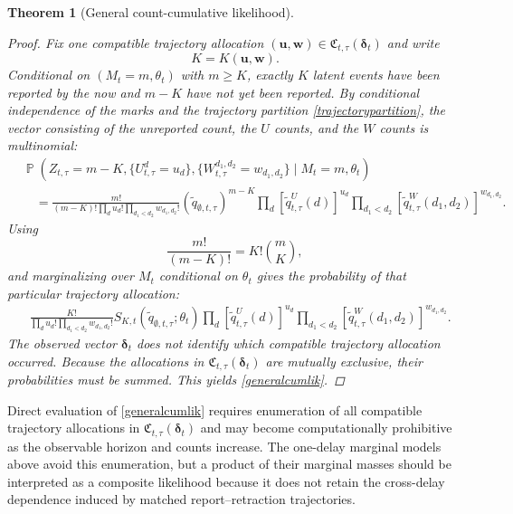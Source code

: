 \documentclass{article}
\newtheorem{theorem}{Theorem}
\theoremstyle{definition}
\theoremstyle{remark}
\newcommand{\Prb}{\operatorname{\mathbb{P}}}
\begin{document}
\begin{theorem}[General count-cumulative likelihood]
\begin{proof}
Fix one compatible trajectory allocation $(\boldsymbol u,\boldsymbol w)\in\mathfrak C_{t,\tau}(\boldsymbol\delta_t)$ and write
\begin{equation}
    K=K(\boldsymbol u,\boldsymbol w).
\end{equation}
Conditional on $(M_t=m,\theta_t)$ with $m\geq K$, exactly $K$ latent events have been reported by the now and $m-K$ have not yet been reported. By conditional independence of the marks and the trajectory partition \eqref{trajectorypartition}, the vector consisting of the unreported count, the $U$ counts, and the $W$ counts is multinomial:
\begin{equation}
\begin{split}
    &\Prb\left(
    Z_{t,\tau}=m-K,
    \{U_{t,\tau}^{d}=u_d\},
    \{W_{t,\tau}^{d_1,d_2}=w_{d_1,d_2}\}
    \mid M_t=m,\theta_t
    \right)\\
    &\quad=
    \frac{m!}
    {(m-K)!
    \displaystyle\prod_d u_d!
    \displaystyle\prod_{d_1<d_2}w_{d_1,d_2}!}
    \left(\tilde q_{\emptyset,t,\tau}\right)^{m-K}
    \prod_d
    \left[\tilde q_{t,\tau}^{U}(d)\right]^{u_d}
    \prod_{d_1<d_2}
    \left[\tilde q_{t,\tau}^{W}(d_1,d_2)\right]^{w_{d_1,d_2}}.
\end{split}
\end{equation}
Using
\begin{equation}
    \frac{m!}{(m-K)!}
    =
    K!\binom{m}{K},
\end{equation}
and marginalizing over $M_t$ conditional on $\theta_t$ gives the probability of that particular trajectory allocation:
\begin{equation}
\begin{split}
    &\frac{K!}
    {\displaystyle\prod_d u_d!
    \displaystyle\prod_{d_1<d_2}w_{d_1,d_2}!}
    S_{K,t}\left(\tilde q_{\emptyset,t,\tau};\theta_t\right)
    \prod_d
    \left[\tilde q_{t,\tau}^{U}(d)\right]^{u_d}
    \prod_{d_1<d_2}
    \left[\tilde q_{t,\tau}^{W}(d_1,d_2)\right]^{w_{d_1,d_2}}.
\end{split}
\end{equation}
The observed vector $\boldsymbol\delta_t$ does not identify which compatible trajectory allocation occurred. Because the allocations in $\mathfrak C_{t,\tau}(\boldsymbol\delta_t)$ are mutually exclusive, their probabilities must be summed. This yields \eqref{generalcumlik}. 
\end{proof}
\end{theorem}

Direct evaluation of \eqref{generalcumlik} requires enumeration of all compatible trajectory allocations in $\mathfrak C_{t,\tau}(\boldsymbol\delta_t)$ and may become computationally prohibitive as the observable horizon and counts increase. The one-delay marginal models above avoid this enumeration, but a product of their marginal masses should be interpreted as a composite likelihood because it does not retain the cross-delay dependence induced by matched report--retraction trajectories.
\end{document}
